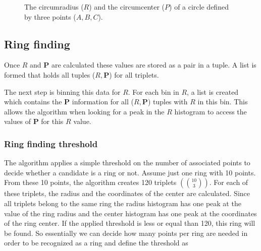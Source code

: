 \documentclass[11pt]{scrreprt}
\begin{document}
%
\begin{figure}[tb]
\centering
{}
\caption{The circumradius ($R$) and the circumcenter ($P$) of a circle defined by three points ($A,B,C$).}
\label{fig:circum_fig}
\end{figure}



\subsection{Ring finding} %
\label{sub:finding_the_radius_and_center_of_a_circle}
Once $R$ and $\mathbf{P}$ are calculated these values are stored as a pair in a tuple. A list is formed that holds all tuples ($R, \mathbf{P}$)
for all triplets.

The next step is binning this data for $R$. For each bin in $R$, a list is created which contains the $\mathbf{P}$ information for all
($R,\mathbf{P}$) tuples with $R$ in this bin. This allows the algorithm when looking for a peak in the $R$ histogram to access the values of
$\mathbf{P}$ for this $R$ value. 

\subsubsection{Ring finding threshold} %
\label{sub:different_thresholds}
The algorithm applies a simple threshold on the number of associated points to decide whether a candidate is a ring or not. Assume just 
one ring with 10 points. From these 10 points, the algorithm creates 120 triplets $\left(\binom{10}{3}\right)$. For each of these triplets,
the radius and the coordinates of the center are calculated. Since all triplets belong to the same ring the radius histogram has one peak at 
the value of the ring radius and the center histogram has one peak at the coordinates of 
the ring center. If the applied threshold is less or equal than 120, this ring will be found. So essentially we can 
decide how many points per ring are needed in order to be recognized as a ring and define the threshold as
\end{document}

